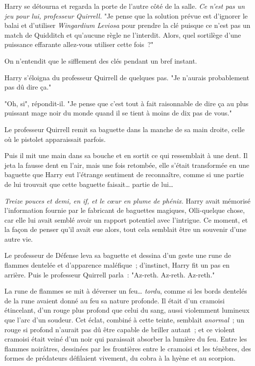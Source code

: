 Harry se détourna et regarda la porte de l'autre côté de la salle. \emph{Ce n'est pas un jeu pour lui, professeur Quirrell.} "Je pense que la solution prévue est d'ignorer le balai et d'utiliser \emph{Wingardium Leviosa} pour prendre la clé puisque ce n'est pas un match de Quidditch et qu'aucune règle ne l'interdit. Alors, quel sortilège d'une puissance effarante allez-vous utiliser cette fois~?"

On n'entendit que le sifflement des clés pendant un bref instant.

Harry s'éloigna du professeur Quirrell de quelques pas. "Je n'aurais probablement pas dû dire ça."

"Oh, si", répondit-il. "Je pense que c'est tout à fait raisonnable de dire ça au plus puissant mage noir du monde quand il se tient à moins de dix pas de vous."

Le professeur Quirrell remit sa baguette dans la manche de sa main droite, celle où le pistolet apparaissait parfois.

Puis il mit une main dans sa bouche et en sortit ce qui ressemblait à une dent. Il jeta la fausse dent en l'air, mais une fois retombée, elle s'était transformée en une baguette que Harry eut l'étrange sentiment de reconnaître, comme si une partie de lui trouvait que cette baguette faisait… partie de lui…

\emph{Treize pouces et demi, en if, et le cœur en plume de phénix}. Harry avait mémorisé l'information fournie par le fabricant de baguettes magiques, Olli-quelque chose, car elle lui avait semblé avoir un rapport potentiel avec l'intrigue. Ce moment, et la façon de penser qu'il avait eue alors, tout cela semblait être un souvenir d'une autre vie.

Le professeur de Défense leva sa baguette et dessina d'un geste une rune de flammes dentelée et d'apparence maléfique~; d'instinct, Harry fit un pas en arrière. Puis le professeur Quirrell parla~: "Az-reth. Az-reth. Az-reth."

La rune de flammes se mit à déverser un feu… \emph{tordu}, comme si les bords dentelés de la rune avaient donné au feu sa nature profonde. Il était d'un cramoisi étincelant, d'un rouge plus profond que celui du sang, aussi violemment lumineux que l'arc d'un soudeur. Cet éclat, combiné à cette teinte, semblait \emph{anormal}~; un rouge si profond n'aurait pas dû être capable de briller autant~; et ce violent cramoisi était veiné d'un noir qui paraissait absorber la lumière du feu. Entre les flammes noirâtres, dessinées par les frontières entre le cramoisi et les ténèbres, des formes de prédateurs défilaient vivement, du cobra à la hyène et au scorpion.

